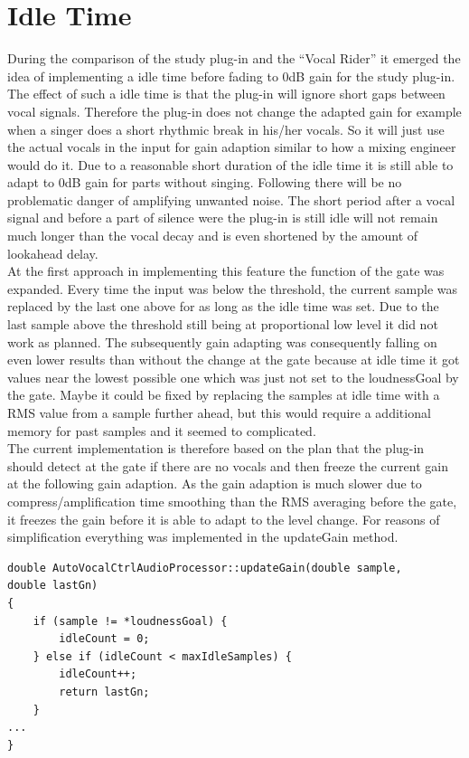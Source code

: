 \section{Idle Time}

During the comparison of the study plug-in and the “Vocal Rider” it emerged the idea of implementing a idle time before fading to 0dB gain for the study plug-in. The effect of such a idle time is that the plug-in will ignore short gaps between vocal signals. Therefore the plug-in does not change the adapted gain for example when a singer does a short rhythmic break in his/her vocals. So it will just use the actual vocals in the input for gain adaption similar to how a mixing engineer would do it. Due to a reasonable short duration of the idle time it is still able to adapt to 0dB gain for parts without singing. Following there will be no problematic danger of amplifying unwanted noise. The short period after a vocal signal and before a part of silence were the plug-in is still idle will not remain much longer than the vocal decay and is even shortened by the amount of lookahead delay.\\
At the first approach in implementing this feature the function of the gate was expanded. Every time the input was below the threshold, the current sample was replaced by the last one above for as long as the idle time was set. Due to the last sample above the threshold still being at proportional low level it did not work as planned. The subsequently gain adapting was consequently falling on even lower results than without the change at the gate because at idle time it got values near the lowest possible one which was just not set to the loudnessGoal by the gate. Maybe it could be fixed by replacing the samples at idle time with a RMS value from a sample further ahead, but this would require a additional memory for past samples and it seemed to complicated.\\
The current implementation is therefore based on the plan that the plug-in should detect at the gate if there are no vocals and then freeze the current gain at the following gain adaption. As the gain adaption is much slower due to compress/amplification time smoothing than the RMS averaging before the gate, it freezes the gain before it is able to adapt to the level change. For reasons of simplification everything was implemented in the updateGain method.\\

\begin{lstlisting}[frame=single]
double AutoVocalCtrlAudioProcessor::updateGain(double sample, 
double lastGn)
{
    if (sample != *loudnessGoal) {
        idleCount = 0;
    } else if (idleCount < maxIdleSamples) {
        idleCount++;
        return lastGn;
    }
...
}
\end{lstlisting}

